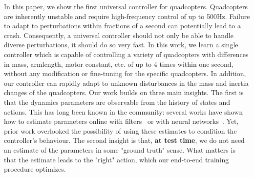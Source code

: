 
In this paper, we show the first universal controller for quadcopters. 
%
Quadcopters are inherently unstable and require high-frequency control of up to 500Hz. 
%
Failure to adapt to perturbations within fractions of a second can potentially lead to a crash.
%
Consequently, a universal controller should not only be able to handle diverse perturbations, it should do so very fast. 
%
%
In this work, we learn a single controller which is capable of controlling a variety of quadcopters with differences in mass, armlength, motor constant, etc. of up to 4 times within one second, without any modification or fine-tuning for the specific quadcopters. 
%
In addition, our controller can rapidly adapt to unknown disturbances in the mass and inertia changes of the quadcopters.
%
Our work builds on three main insights.
%
The first is that the dynamics parameters are observable from the history of states and actions.
%
This has long been known in the community: several works have shown how to estimate parameters online with filters~\cite{svacha2020imu,wuest2019online} or with neural networks~\cite{forgione2021continuous}.
%
Yet, prior work overlooked the possibility of using these estimates to condition the controller's behaviour.
%
The second insight is that, \textbf{at test time}, we do not need an estimate of the parameters in some "ground truth" sense.
%
What matters is that the estimate leads to the "right" action, which our end-to-end training procedure optimizes.
